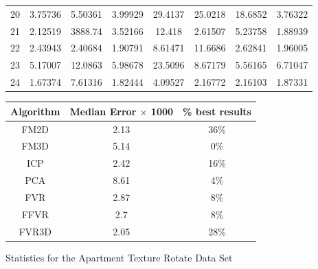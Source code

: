 \begin{figure}
\begin{tabular}{cccccccc}
20 & 3.75736 & 5.50361 & 3.99929 & 29.4137 & 25.0218 & 18.6852 & 3.76322\\
21 & 2.12519 & 3888.74 & 3.52166 & 12.418 & 2.61507 & 5.23758 & 1.88939\\
22 & 2.43943 & 2.40684 & 1.90791 & 8.61471 & 11.6686 & 2.62841 & 1.96005\\
23 & 5.17007 & 12.0863 & 5.98678 & 23.5096 & 8.67179 & 5.56165 & 6.71047\\
24 & 1.67374 & 7.61316 & 1.82444 & 4.09527 & 2.16772 & 2.16103 & 1.87331\\
\end{tabular}
\vspace{10mm}
\centering
\begin{tabular}{ccc}
\hline
\textbf{Algorithm} & \textbf{Median Error $\times$ 1000} & \textbf{\% best results}\\ \hline
FM2D	& 2.13 & 36\%\\
FM3D	& 5.14 & 0\%\\
ICP	& 2.42 & 16\%\\
PCA	& 8.61 & 4\%\\
FVR	& 2.87 & 8\%\\
FFVR	& 2.7 & 8\%\\
FVR3D	& 2.05 & 28\%\\
\end{tabular}
\caption{Statistics for the Apartment Texture Rotate Data Set}
\label{tab:apartmenttexturerotate}
\end{figure} 



